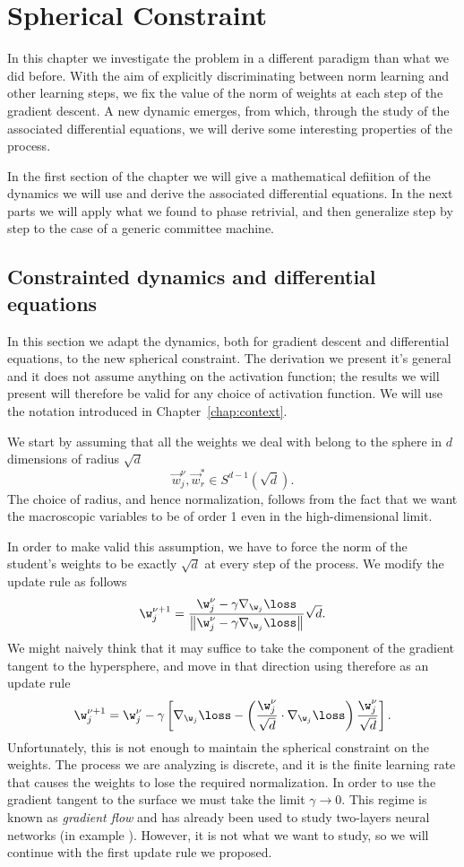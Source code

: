 \chapter{Spherical Constraint}
In this chapter we investigate the problem in a different paradigm than what we did before.
With the aim of explicitly discriminating between norm learning and other learning steps,
we fix the value of the norm of weights at each step of the gradient descent.
A new dynamic emerges, from which, through the study of the associated differential equations,
we will derive some interesting properties of the process.

In the first section of the chapter we will give a mathematical defiition of the dynamics we will use and derive the associated differential equations.
In the next parts we will apply what we found to phase retrivial, and then generalize step by step to the case of a generic committee machine.


\section{Constrainted dynamics and differential equations}
In this section we adapt the dynamics, both for gradient descent and differential equations, to the new spherical constraint.
The derivation we present it's general and it does not assume anything on the activation function;
the results we will present will therefore be valid for any choice of activation function.
We will use the notation introduced in Chapter~\ref{chap:context}.

We start by assuming that all the weights we deal with belong to the sphere in \(d\) dimensions of radius \(\sqrt{d}\)
\[
  \vec{w}^\nu_j, \vec{w}^*_r \in S^{d-1}{\left(\sqrt{d}\right)}.
\]
The choice of radius, and hence normalization, follows from the fact that we want
the macroscopic variables to be of order 1 even in the high-dimensional limit.

In order to make valid this assumption, we have to force the norm of the student's weights to be
exactly \(\sqrt{d}\) at every step of the process. We modify the update rule as follows
\[ \w^{\nu+1}_j =\frac{\w^{\nu}_j - \gamma \nabla_{\w_j}{\loss}}{\left\|\w^{\nu}_j - \gamma \nabla_{\w_j}{\loss}\right\|}\sqrt{d}.\]
We might naively think that it may suffice to take the component of the gradient tangent to the hypersphere,
and move in that direction using therefore as an update rule
\[
  \w^{\nu+1}_j = \w^{\nu}_j - \gamma \left[
    \nabla_{\w_j}{\loss} - \left(\frac{\w^{\nu}_j}{\sqrt{d}}\cdot\nabla_{\w_j}{\loss}\right)\frac{\w^{\nu}_j}{\sqrt{d}}
  \right].
\]
Unfortunately, this is not enough to maintain the spherical constraint on the weights.
The process we are analyzing is discrete, and it is the finite learning rate that causes the weights to lose the required normalization.
In order to use the gradient tangent to the surface we must take the limit \(\gamma\to0\).
This regime is known as \emph{gradient flow} and has already been used to study two-layers neural networks (in example \cite{chizat2018global}).
However, it is not what we want to study, so we will continue with the first update rule we proposed.

